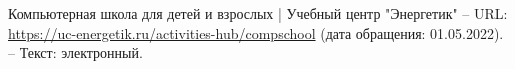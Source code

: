 \begin{thebibliography}{00}
        Компьютерная школа для детей и взрослых | Учебный центр "Энергетик"
        --
        URL:
        \href{https://uc-energetik.ru/activities-hub/compschool}{https://uc-energetik.ru/activities-hub/compschool}
        (дата обращения: 01.05.2022).
        --
        Текст: электронный.




\begin{comment}

    \bibitem{livejournal}
        Главное - ЖЖ
        [Электронный ресурс] //
        LiveJournal — сервис для ведения блога и развития сообщества
        --
        Режим доступа:
        \href{https://www.livejournal.com/}{https://www.livejournal.com/}
        
    \bibitem{kickstarter}
        Kickstarter
        [Электронный ресурс] //
        Kickstarter - краудфандинговая платформа.
        --
        Режим доступа:
        \href{https://www.kickstarter.com/}{https://www.kickstarter.com/}

    \bibitem{ozon}
        OZON — интернет-магазин. Миллионы товаров по выгодным ценам
        [Электронный ресурс] //
        OZON. Интернет магазин
        --
        Режим доступа:
        \href{https://www.ozon.ru/}{https://www.ozon.ru/}

    \bibitem{stepik}
        Stepik
        [Электронный ресурс] //
        Stepik - интернет платформа для создания и распространения обучающего контента
        --
        Режим доступа:
        \href{https://stepik.org}{https://stepik.org/}

    \bibitem{vk}
        ВКонтакте
        [Электронный ресурс] //
        ВКонтакте - социальная сеть
        --
        Режим доступа:
        \href{https://vk.com/}{https://vk.com/}

    \bibitem{wiki}
        Википедия
        [Электронный ресурс] //
        Википедия. Свободная энциклопедия
        --
        Режим доступа:
        \href{https://ru.wikipedia.org/}{https://ru.wikipedia.org/}

    \bibitem{wiki-CMS}
        CMS -- Википедия 
        [Электронный ресурс] //
        Википедия. Свободная энциклопедия
        --
        Режим доступа:
        \href{https://ru.wikipedia.org/wiki/CMS}{https://ru.wikipedia.org/wiki/CMS}

    \bibitem{cmsmagazine}
        Движки для сайтов, платные и бесплатные CMS системы, каталог систем управления сайтами
        [Электронный ресурс] //
        CMS Magazine - digital-журнал
        --
        Режим доступа:
        \href{https://cmsmagazine.ru/cms/}{https://cmsmagazine.ru/cms/}


\end{comment}
\end{thebibliography}
